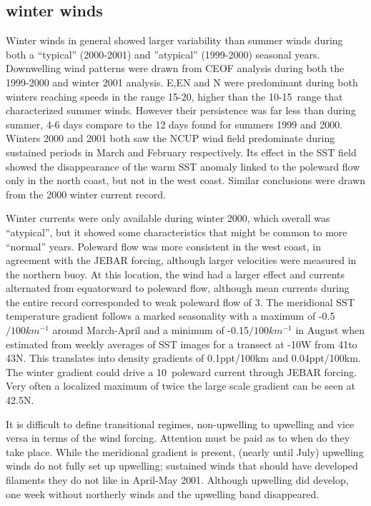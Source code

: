 \subsection{winter winds}

Winter winds in general showed larger variability than summer
winds during both a ``typical'' (2000-2001) and ''atypical''
(1999-2000) seasonal years. Downwelling wind patterns were drawn
from CEOF analysis during both the 1999-2000 and winter 2001
analysis. E,EN and N were predominant during both winters reaching
speeds in the range 15-20\vel, higher than the 10-15\vel\, range
that characterized summer winds. However their persistence was far
less than during summer, 4-6 days compare to the 12 days found for
summers 1999 and 2000. Winters 2000 and 2001 both saw the NCUP
wind field predominate during sustained periods in March and
February respectively. Its effect in the SST field showed the
disappearance of the warm SST anomaly linked to the poleward flow
only in the north coast, but not in the west coast. Similar
conclusions were drawn from the 2000 winter current record.


Winter currents were only available during winter 2000, which
overall was ``atypical'', but it showed some characteristics that
might be common to more ``normal'' years. Poleward flow was more
consistent in the west coast, in agreement with the JEBAR forcing,
although larger velocities were measured in the northern buoy. At
this location, the wind had a larger effect and currents
alternated from equatorward to poleward flow, although mean
currents during the entire record corresponded to weak poleward
flow of 3\velc. The meridional SST temperature gradient follows a
marked seasonality with a maximum of -0.5\deg $ /100 km^{-1}$
around March-April and a minimum of -0.15\deg $ /100 km^{-1}$ in
August when estimated from weekly averages of SST images for a
transect at -10\deg W from 41\deg to 43\deg N. This translates
into density gradients of 0.1ppt/100km and 0.04ppt/100km. The
winter gradient could drive a 10\velc\, poleward current through
JEBAR forcing. Very often a localized maximum of twice the large
scale gradient can be seen at 42.5\deg N.

It is difficult to define transitional regimes, non-upwelling to
upwelling and vice versa in terms of the wind forcing. Attention
must be paid as to when do they take place. While the meridional
gradient is present, (nearly until July) upwelling winds do not
fully set up upwelling; sustained winds that should have developed
filaments they do not like in April-May 2001. Although upwelling
did develop, one week without northerly winds and the upwelling
band disappeared.

